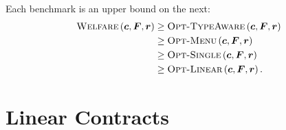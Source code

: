 \documentclass{article}
\newcommand{\jonnote}[1]{}
\newcommand{\D}{\mathcal{D}}
\newcommand{\E}{\mathbb{E}}
\def \Rev  {{\sf Rev}}
\def \Welf  {{\sf Welf}}
\newcommand{\costvector}{\bm{c}}
\newcommand{\ForecastTensor}{\bm{F}}
\newcommand{\rewardvector}{\bm{r}}
\newcommand{\PrincipalAgentProblem}{\left(\costvector, \ForecastTensor, \rewardvector\right)}
\newcommand{\OWelfare}{\textsc{Welfare}}
\newcommand{\OTypeAware}{\textsc{Opt-TypeAware}}
\newcommand{\OMenu}{\textsc{Opt-Menu}}
\newcommand{\OSingle}{\textsc{Opt-Single}}
\newcommand{\OLinear}{\textsc{Opt-Linear}}
\begin{document}
Each benchmark is an upper bound on the next:
\begin{align*}
  \OWelfare\PrincipalAgentProblem &\ge \OTypeAware\PrincipalAgentProblem \\
                     &\ge \OMenu\PrincipalAgentProblem\\
                     &\ge \OSingle\PrincipalAgentProblem \\
                     &\ge \OLinear\PrincipalAgentProblem \text{.}
\end{align*}
\section{Linear Contracts}
\label{sec:linear}






\end{document}
